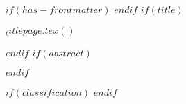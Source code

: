$if(has-frontmatter)$
\frontmatter
$endif$
$if(title)$
 
  \begin{titlepage}
  $_titlepage.tex()$
  \end{titlepage}

$endif$
$if(abstract)$
\begin{abstract}
$abstract$
\end{abstract}
$endif$

$if(classification)$
\thispagestyle{plain} 
$endif$


